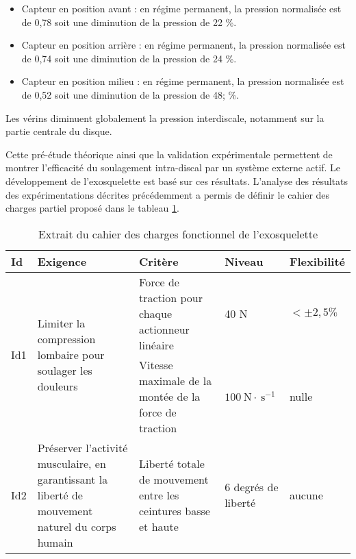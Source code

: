 \ifprof
\begin{corrige}
\begin{itemize}
\item Capteur en position avant : en régime permanent, la pression normalisée est de 0,78 soit une diminution de la pression de 22\; \%.
\item Capteur en position arrière : en régime permanent, la pression normalisée est de 0,74 soit une diminution de la pression de 24\; \%.
\item Capteur en position milieu : en régime permanent, la pression normalisée est de 0,52 soit une diminution de la pression de 48; \%.
\end{itemize}
Les vérins diminuent globalement la pression interdiscale, notamment sur la partie centrale du disque.
\end{corrige}
\else
\fi

\ifprof
\else

Cette pré-étude théorique ainsi que la validation expérimentale permettent de montrer l'efficacité du soulagement intra-discal par un système externe actif. Le développement de l'exosquelette est basé sur ces résultats. L'analyse des résultats des expérimentations décrites précédemment a permis de définir le cahier des charges partiel proposé dans le tableau \ref{ccs_mp_2023_tab_01}.

\begin{table}[h]
\begin{center}
\begin{tabular}{lp{5cm}p{5cm}ll}
\hline
\textbf{Id} & \textbf{Exigence} & \textbf{Critère} & \textbf{Niveau} & \textbf{Flexibilité} \\
\hline
\multirow[t]{2}{*}{Id1} & \multirow[t]{2}{4cm}{Limiter la compression lombaire pour soulager les douleurs} & Force de traction pour chaque actionneur linéaire & 40 N & $< \pm 2,5 \%$ \\
 &  & Vitesse maximale de la montée de la force de traction & $100 \mathrm{~N} \cdot \mathrm{~s}^{-1}$ & nulle \\
\hline
Id2 & Préserver l'activité musculaire, en garantissant la liberté de mouvement naturel du corps humain & Liberté totale de mouvement entre les ceintures basse et haute & 6 degrés de liberté & aucune \\
\hline
\end{tabular}
\caption{Extrait du cahier des charges fonctionnel de l'exosquelette \label{ccs_mp_2023_tab_01}}
\end{center}
\end{table}
\fi

